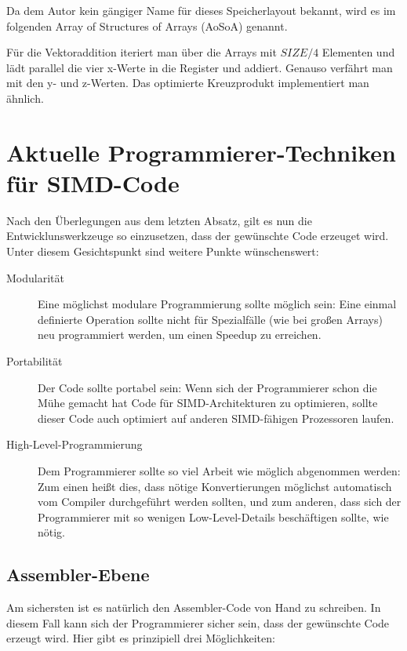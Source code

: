 \documentclass[a4paper,10pt]{article}
\begin{document}
Da dem Autor kein gängiger Name für dieses Speicherlayout bekannt, wird es im folgenden Array of
Structures of Arrays (AoSoA) genannt.

Für die Vektoraddition iteriert man über die Arrays mit $SIZE/4$ Elementen und lädt parallel 
die vier x-Werte in die Register und addiert. Genauso verfährt man mit den y- und z-Werten.
Das optimierte Kreuzprodukt implementiert man ähnlich.

\newpage
\section{Aktuelle Programmierer-Techniken für SIMD-Code}

Nach den Überlegungen aus dem letzten Absatz, gilt es nun die Entwicklunswerkzeuge so einzusetzen,
dass der gewünschte Code erzeuget wird. Unter diesem Gesichtspunkt sind weitere Punkte
wünschenswert:

\begin{description}
    \item[Modularität] Eine möglichst modulare Programmierung sollte möglich sein: Eine einmal definierte
    Operation sollte nicht für Spezialfälle (wie bei großen Arrays) neu programmiert werden, um
    einen Speedup zu erreichen.

    \item[Portabilität] Der Code sollte portabel sein: Wenn sich der Programmierer schon die Mühe gemacht hat Code
    für SIMD-Architekturen zu optimieren, sollte dieser Code auch optimiert auf anderen SIMD-fähigen
    Prozessoren laufen.

    \item[High-Level-Programmierung] Dem Programmierer sollte so viel Arbeit wie möglich abgenommen werden: Zum einen heißt
    dies, dass nötige Konvertierungen möglichst automatisch vom Compiler durchgeführt werden
    sollten, und zum anderen, dass sich der Programmierer mit so wenigen Low-Level-Details
    beschäftigen sollte, wie nötig.

\end{description}

\subsection{Assembler-Ebene}

Am sichersten ist es natürlich den Assembler-Code von Hand zu schreiben. In diesem Fall kann sich
der Programmierer sicher sein, dass der gewünschte Code erzeugt wird. Hier gibt es prinzipiell drei
Möglichkeiten:
\end{document}
